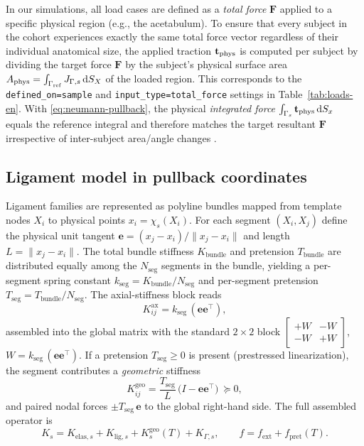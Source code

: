 \documentclass[11pt]{article}
\begin{document}
In our simulations, all load cases are defined as a \emph{total force} $\mathbf F$ applied to a specific physical region (e.g., the acetabulum). To ensure that every subject in the cohort experiences exactly the same total force vector regardless of their individual anatomical size, the applied traction $\mathbf t_{\rm phys}$ is computed per subject by dividing the target force $\mathbf F$ by the subject's physical surface area $A_{\rm phys} = \int_{\Gamma_{\rm ref}} J_{\Gamma,s}\,\mathrm dS_X$ of the loaded region. This corresponds to the \texttt{defined\_on=sample} and \texttt{input\_type=total\_force} settings in Table~\ref{tab:loads-en}. With \eqref{eq:neumann-pullback}, the physical \emph{integrated force} $\int_{\Gamma_s}\mathbf t_{\rm phys}\,\mathrm dS_x$ equals the reference integral and therefore matches the target resultant $\mathbf F$ irrespective of inter-subject area/angle changes \citep[see, e.g.,][]{BonetWood1997,MarsdenHughes1983}. 

\subsection{Ligament model in pullback coordinates}
\label{sec:ligmodel}
Ligament families are represented as polyline bundles mapped from template nodes $X_i$ to physical points $x_i=\chi_s(X_i)$. For each segment $(X_i,X_j)$ define the physical unit tangent $\mathbf e=(x_j-x_i)/\|x_j-x_i\|$ and length $L=\|x_j-x_i\|$. The total bundle stiffness $K_{\text{bundle}}$ and pretension $T_{\text{bundle}}$ are distributed equally among the $N_{\text{seg}}$ segments in the bundle, yielding a per-segment spring constant $k_{\text{seg}} = K_{\text{bundle}} / N_{\text{seg}}$ and per-segment pretension $T_{\text{seg}} = T_{\text{bundle}} / N_{\text{seg}}$. The axial-stiffness block reads
\begin{equation}
K^{\text{ax}}_{ij}=k_{\text{seg}}\,(\mathbf e\mathbf e^\top),
\end{equation}
assembled into the global matrix with the standard $2\times2$ block $\begin{bmatrix} +W & -W \\ -W & +W\end{bmatrix}$, $W=k_{\text{seg}}\,(\mathbf e\mathbf e^\top)$.
If a pretension $T_{\text{seg}}\ge 0$ is present (prestressed linearization), the segment contributes a \emph{geometric} stiffness
\begin{equation}
K^{\text{geo}}_{ij}=\frac{T_{\text{seg}}}{L}\,\big(I-\mathbf e\mathbf e^\top\big)\ \succeq 0,
\end{equation}
and paired nodal forces $\pm T_{\text{seg}}\,\mathbf e$ to the global right-hand side. The full assembled operator is
\begin{equation}
K_s=K_{\text{elas},s}+K_{\text{lig},s}+K^{\text{geo}}_s(T)+K_{\Gamma,s},\qquad f=f_{\text{ext}}+f_{\text{pret}}(T).
\end{equation}
\end{document}
